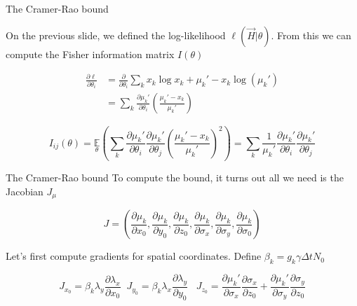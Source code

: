 \documentclass[aspectratio=169]{beamer}
\begin{document}
\begin{frame}{The Cramer-Rao bound}

On the previous slide, we defined the log-likelihood $\ell(\vec{H}|\theta)$. From this we can compute the Fisher information matrix $I(\theta)$

\begin{align*}
\frac{\partial \ell}{\partial \theta_{i}} &= \frac{\partial}{\partial \theta_{i}} \sum_{k}  x_{k}\log x_{k} + \mu_{k}' - x_{k}\log\left(\mu_{k}'\right)\\
&= \sum_{k} \frac{\partial \mu_{k}'}{\partial\theta_{i}} \left(\frac{\mu_{k}'-x_{k}}{\mu_{k}'}\right)
\end{align*}

\begin{equation*}
I_{ij}(\theta) = \underset{\theta}{\mathbb{E}}\left(\sum_{k}\frac{\partial \mu_{k}'}{\partial\theta_{i}}\frac{\partial \mu_{k}'}{\partial\theta_{j}} \left(\frac{\mu_{k}'-x_{k}}{\mu_{k}'}\right)^{2}\right) = \sum_{k}\frac{1}{\mu_{k}'}\frac{\partial \mu_{k}'}{\partial\theta_{i}}\frac{\partial \mu_{k}'}{\partial\theta_{j}}
\end{equation*}

\end{frame}

\begin{frame}{The Cramer-Rao bound}
To compute the bound, it turns out all we need is the Jacobian $J_{\mu}$

\begin{equation*}
J = \left(\frac{\partial \mu_{k}}{\partial x_{0}},\frac{\partial \mu_{k}}{\partial y_{0}},\frac{\partial \mu_{k}}{\partial z_{0}},\frac{\partial \mu_{k}}{\partial \sigma_{x}},\frac{\partial \mu_{k}}{\partial \sigma_{y}},\frac{\partial \mu_{k}}{\partial \sigma_{0}}\right)
\end{equation*}

Let's first compute gradients for spatial coordinates. Define $\beta_{k} = g_{k}\gamma\Delta t N_{0}$

\begin{equation*}
J_{x_{0}} = \beta_{k}\lambda_{y}\frac{\partial \lambda_{x}}{\partial x_{0}} \;\; J_{y_{0}} = \beta_{k}\lambda_{x}\frac{\partial \lambda_{y}}{\partial y_{0}}\;\;\; J_{z_{0}}  = \frac{\partial \mu_{k}'}{\partial \sigma_{x}}\frac{\partial \sigma_{x}}{\partial z_{0}} + \frac{\partial \mu_{k}'}{\partial \sigma_{y}}\frac{\partial \sigma_{y}}{\partial z_{0}}
\end{equation*}


\end{frame}
\end{document}
